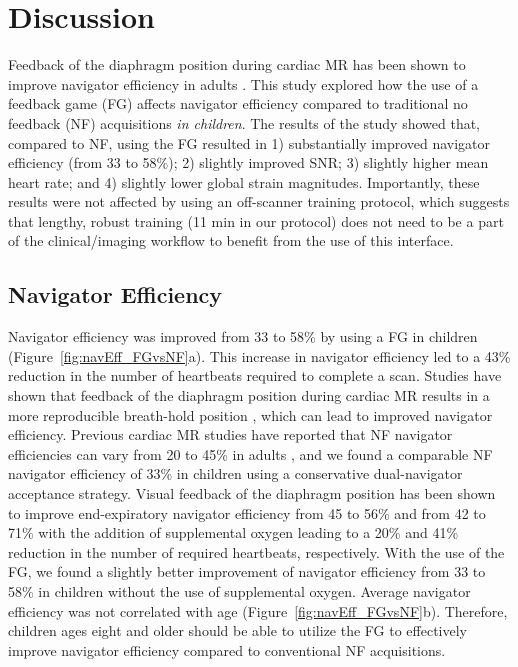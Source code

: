 \section{Discussion}
	Feedback of the diaphragm position during cardiac MR has been shown to improve navigator efficiency in adults \cite{Feuerlein2009,Jhooti2011}. This study explored how the use of a feedback game (FG) affects navigator efficiency compared to traditional no feedback (NF) acquisitions \textit{in children}. The results of the study showed that, compared to NF, using the FG resulted in 1) substantially improved navigator efficiency (from 33 to 58\%); 2) slightly improved SNR; 3) slightly higher mean heart rate; and 4) slightly lower global strain magnitudes. Importantly, these results were not affected by using an off-scanner training protocol, which suggests that lengthy, robust training (11 min in our protocol) does not need to be a part of the clinical/imaging workflow to benefit from the use of this interface.

	\subsection{Navigator Efficiency}
		Navigator efficiency was improved from 33 to 58\% by using a FG in children (Figure~\ref{fig:navEff_FGvsNF}a). This increase in navigator efficiency led to a 43\% reduction in the number of heartbeats required to complete a scan. Studies have shown that feedback of the diaphragm position during cardiac MR results in a more reproducible breath-hold position \cite{Feuerlein2009,Jhooti2011,Kim2012}, which can lead to improved navigator efficiency. Previous cardiac MR studies have reported that NF navigator efficiencies can vary from 20 to 45\% in adults \cite{Abd-Elmoniem2011,Feuerlein2009,Jhooti2011,Wang1996}, and we found a comparable NF navigator efficiency of 33\% in children using a conservative dual-navigator acceptance strategy. Visual feedback of the diaphragm position has been shown to improve end-expiratory navigator efficiency from 45 to 56\% \cite{Jhooti2011} and from 42 to 71\% with the addition of supplemental oxygen \cite{Feuerlein2009} leading to a 20\% and 41\% reduction in the number of required heartbeats, respectively. With the use of the FG, we found a slightly better improvement of navigator efficiency from 33 to 58\% in children without the use of supplemental oxygen. Average navigator efficiency was not correlated with age (Figure~\ref{fig:navEff_FGvsNF}b). Therefore, children ages eight and older should be able to utilize the FG to effectively improve navigator efficiency compared to conventional NF acquisitions.
		
